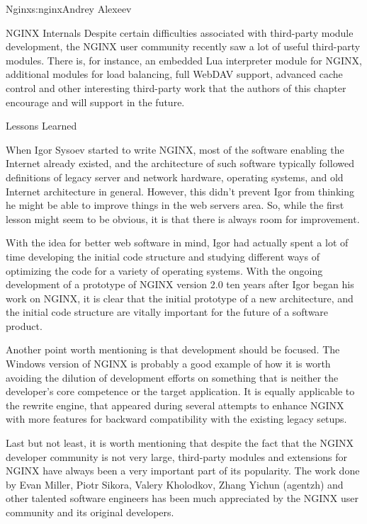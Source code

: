 \begin{aosachapter}{Nginx}{s:nginx}{Andrey Alexeev}
\begin{aosasect1}{NGINX Internals}
Despite certain difficulties associated with third-party module
development, the NGINX user community recently saw a lot of useful
third-party modules. There is, for instance, an embedded Lua
interpreter module for NGINX, additional modules for load balancing,
full WebDAV support, advanced cache control and other interesting
third-party work that the authors of this chapter encourage and will
support in the future.

\end{aosasect1}

\begin{aosasect1}{Lessons Learned}

When Igor Sysoev started to write NGINX, most of the software enabling
the Internet already existed, and the architecture of such software
typically followed definitions of legacy server and network hardware,
operating systems, and old Internet architecture in general. However,
this didn't prevent Igor from thinking he might be able to improve
things in the web servers area. So, while the first lesson might seem
to be obvious, it is that there is always room for improvement.

With the idea for better web software in mind, Igor had actually spent
a lot of time developing the initial code structure and studying
different ways of optimizing the code for a variety of operating
systems. With the ongoing development of a prototype of NGINX version
2.0 ten years after Igor began his work on NGINX, it is clear that the
initial prototype of a new architecture, and the initial code
structure are vitally important for the future of a software product.

Another point worth mentioning is that development should be
focused. The Windows version of NGINX is probably a good example of
how it is worth avoiding the dilution of development efforts on
something that is neither the developer's core competence or the
target application. It is equally applicable to the rewrite engine,
that appeared during several attempts to enhance NGINX with more
features for backward compatibility with the existing legacy setups.

Last but not least, it is worth mentioning that despite the fact that
the NGINX developer community is not very large, third-party modules
and extensions for NGINX have always been a very important part of its
popularity. The work done by Evan Miller, Piotr Sikora, Valery
Kholodkov, Zhang Yichun (agentzh) and other talented software
engineers has been much appreciated by the NGINX user community and
its original developers.

\end{aosasect1}

\end{aosachapter}
